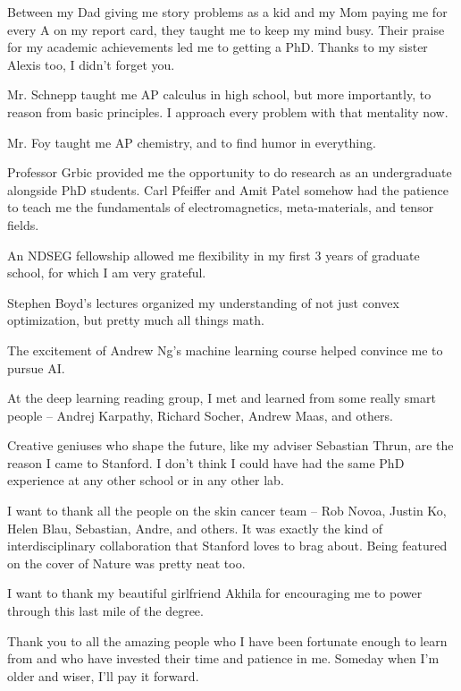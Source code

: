 Between my Dad giving me story problems as a kid and my Mom paying me for every A on my report card, they taught me to keep my mind busy.  Their praise for my academic achievements led me to getting a PhD.  Thanks to my sister Alexis too, I didn't forget you.

Mr. Schnepp taught me AP calculus in high school, but more importantly, to reason from basic principles.  I approach every problem with that mentality now.

Mr. Foy taught me AP chemistry, and to find humor in everything.

Professor Grbic provided me the opportunity to do research as an undergraduate alongside PhD students.  Carl Pfeiffer and Amit Patel somehow had the patience to teach me the fundamentals of electromagnetics, meta-materials, and tensor fields.

An NDSEG fellowship allowed me flexibility in my first 3 years of graduate school, for which I am very grateful.

Stephen Boyd's lectures organized my understanding of not just convex optimization, but pretty much all things math.

The excitement of Andrew Ng's machine learning course helped convince me to pursue AI.

At the deep learning reading group, I met and learned from some really smart people -- Andrej Karpathy, Richard Socher, Andrew Maas, and others.

Creative geniuses who shape the future, like my adviser Sebastian Thrun, are the reason I came to Stanford.  I don't think I could have had the same PhD experience at any other school or in any other lab.

I want to thank all the people on the skin cancer team -- Rob Novoa, Justin Ko, Helen Blau, Sebastian, Andre, and others.  It was exactly the kind of interdisciplinary collaboration that Stanford loves to brag about.  Being featured on the cover of Nature was pretty neat too.

I want to thank my beautiful girlfriend Akhila for encouraging me to power through this last mile of the degree.

Thank you to all the amazing people who I have been fortunate enough to learn from and who have invested their time and patience in me.  Someday when I’m older and wiser, I’ll pay it forward.